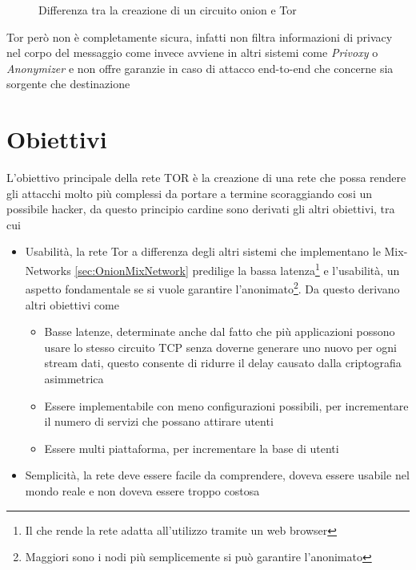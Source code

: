 \begin{figure}[htpb!]
    \centering
    
    \caption{Differenza tra la creazione di un circuito onion e Tor}
    \label{fig:telescopic}
\end{figure}

Tor però non è completamente sicura, infatti non filtra informazioni di privacy nel corpo del messaggio come invece avviene in altri sistemi come \emph{Privoxy} o \emph{Anonymizer} e non offre garanzie in caso di attacco end-to-end che concerne sia sorgente che destinazione
\cite{onionv2}

\section{Obiettivi}
L'obiettivo principale della rete TOR è la creazione di una rete che possa rendere gli attacchi molto più complessi da portare a termine scoraggiando cosi un possibile hacker, da questo principio cardine sono derivati gli altri obiettivi, tra cui
\begin{itemize}
    \item Usabilità, la rete Tor a differenza degli altri sistemi che implementano le Mix-Networks \ref{sec:OnionMixNetwork} predilige la bassa latenza\footnote{Il che rende la rete adatta all'utilizzo tramite un web browser} e l'usabilità, un aspetto fondamentale se si vuole garantire l'anonimato\footnote{Maggiori sono i nodi più semplicemente si può garantire l'anonimato}.
    Da questo derivano altri obiettivi come
    \begin{itemize}
        \item Basse latenze, determinate anche dal fatto che più applicazioni possono usare lo stesso circuito TCP senza doverne generare uno nuovo per ogni stream dati, questo consente di ridurre il delay causato dalla criptografia asimmetrica
        \item Essere implementabile con meno configurazioni possibili, per incrementare il numero di servizi che possano attirare utenti
        \item Essere multi piattaforma, per incrementare la base di utenti
    \end{itemize}
    \item Semplicità, la rete deve essere facile da comprendere, doveva essere usabile nel mondo reale e non doveva essere troppo costosa
\end{itemize}
\cite{ChaumMixes}

\newpage


